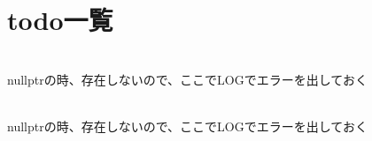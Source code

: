 \chapter{todo一覧 }
\hypertarget{todo}{}\label{todo}

\begin{DoxyRefList}
\item[メンバ \doxylink{class_scene_a9e143dc2e860651e852c1b45b0d9b3c3}{Scene\+::Get\+Object\+Ptr} (std\+::string\+\_\+view name="{}"{})]\hfill \\
\label{todo__todo000001}%
%
nullptrの時、存在しないので、ここで\+LOGでエラーを出しておく  
\item[メンバ \doxylink{struct_scene_1_1_object_a964e234a55f60b3989ad24a26df11c15}{Scene\+::Object\+::Get} (std\+::string\+\_\+view name="{}"{})]\hfill \\
\label{todo__todo000002}%
%
nullptrの時、存在しないので、ここで\+LOGでエラーを出しておく 
\end{DoxyRefList}